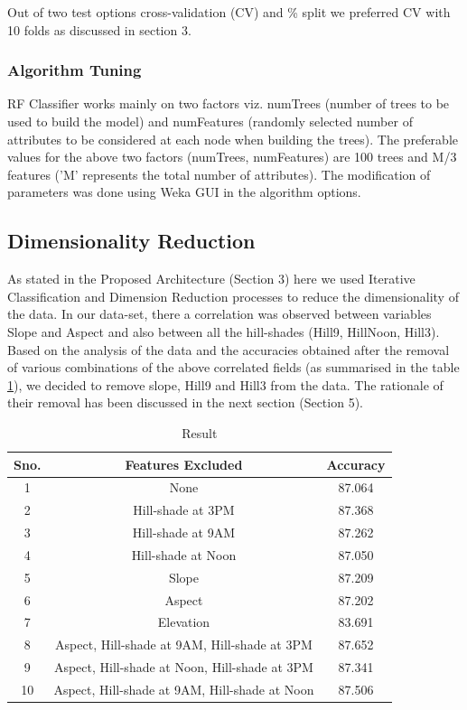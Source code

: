 \documentclass{llncs}
\begin{document}
Out of two test options cross-validation (CV) and \% split we preferred CV with 10 folds as discussed in section 3.


\subsubsection{Algorithm Tuning}
RF Classifier works mainly on two factors viz. numTrees (number of trees to be used to build the model) and numFeatures (randomly selected number of attributes to be considered at each node when building the trees). The preferable\cite{Khoshgoftar} values for the above two factors (numTrees, numFeatures) are 100 trees and M/3 features ('M' represents the total number of attributes). The modification of parameters was done using Weka GUI in the algorithm options.


\subsection{Dimensionality Reduction}

As stated in the Proposed Architecture (Section 3) here we used Iterative Classification and Dimension Reduction processes to reduce the dimensionality of the data. In our data-set, there a correlation was observed between variables Slope and Aspect and also between all the hill-shades (Hill9, HillNoon, Hill3). Based on the analysis of the data and the accuracies obtained after the removal of various combinations of the above correlated fields (as summarised in the table \ref{accuracy}), we decided to remove slope, Hill9 and Hill3 from the data. The rationale of their removal has been discussed in the next section (Section 5).


\begin{table}[!t]
    \renewcommand{\arraystretch}{1.2}
    \caption{Result}
    \label{accuracy}
    \centering
        \begin{tabular}{|c|c|c|}
        \hline\rule{0pt}{12pt}
        \textbf{Sno.} & \textbf{Features Excluded} & \textbf{Accuracy} \\[2pt]
        \hline
        1 & None & 87.064 \\
        \hline
        2 & Hill-shade at 3PM & 87.368 \\
        \hline
        3 & Hill-shade at 9AM & 87.262 \\
        \hline
        4 & Hill-shade at Noon & 87.050 \\
        \hline
        5 & Slope & 87.209 \\
        \hline
        6 & Aspect & 87.202 \\
        \hline
        7 & Elevation & 83.691 \\
        \hline
        8 & Aspect, Hill-shade at 9AM, Hill-shade at 3PM & 87.652 \\
        \hline
        9 & Aspect, Hill-shade at Noon, Hill-shade at 3PM & 87.341 \\
        \hline
        10 & Aspect, Hill-shade at 9AM, Hill-shade at Noon & 87.506 \\
        \hline
        \end{tabular}
\end{table}
\end{document}
